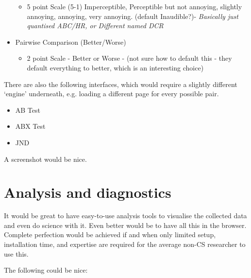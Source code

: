 \documentclass{sig-alternate}
\begin{document}
\begin{itemize}
		\begin{itemize}
			\item 5 point Scale (5-1) Imperceptible, Perceptible but not annoying, slightly annoying, annoying, very annoying. (default Inaudible?)- {\it Basically just quantised ABC/HR, or Different named DCR}
		\end{itemize}
		\item Pairwise Comparison (Better/Worse)~\cite{david1963method}
		\begin{itemize}
			\item 2 point Scale - Better or Worse - (not sure how to default this - they default everything to better, which is an interesting choice)
		\end{itemize}
	\end{itemize}
	
	There are also the following interfaces, which would require a slightly different `engine' underneath, e.g. loading a different page for every possible pair. 
	\begin{itemize}
		\item AB Test~\cite{lipshitz1981great}
		\item ABX Test~\cite{clark1982high}
		\item JND
	\end{itemize}
	
	A screenshot would be nice. 

\section{Analysis and diagnostics}
	It would be great to have easy-to-use analysis tools to visualise the collected data and even do science with it. Even better would be to have all this in the browser. Complete perfection would be achieved if and when only limited setup, installation time, and expertise are required for the average non-CS researcher to use this. 
	
	The following could be nice: 
	
\end{document}
